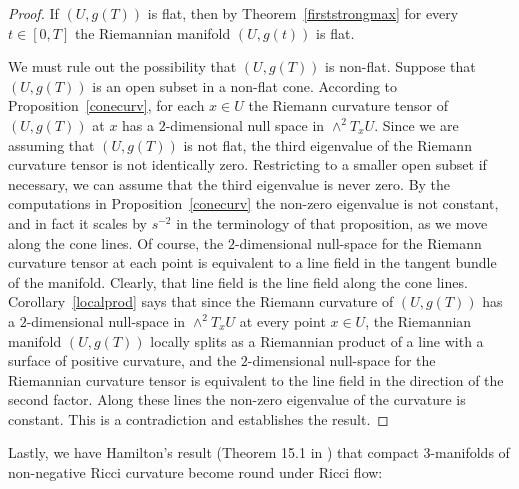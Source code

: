 \begin{proof}
If $(U,g(T))$ is flat, then by Theorem~\ref{firststrongmax}
 for every $t\in [0,T]$ the
Riemannian manifold $(U,g(t))$ is flat.

We must rule out the possibility that $(U,g(T))$ is  non-flat. Suppose that
$(U,g(T))$ is an open subset in a non-flat cone. According to
Proposition~\ref{conecurv},  for each $x\in U$ the Riemann curvature tensor of
$(U,g(T))$ at $x$ has a $2$-dimensional null space in $\wedge^2T_xU$. Since we
are assuming that $(U,g(T))$ is not flat, the third eigenvalue of the Riemann
curvature tensor is not identically zero. Restricting to a smaller open subset
if necessary, we can assume that the third eigenvalue is never zero. By the
computations in Proposition~\ref{conecurv} the non-zero eigenvalue is not
constant, and in fact it scales by $s^{-2}$ in the terminology of that
proposition, as we move along the cone lines. Of course, the $2$-dimensional
null-space for the Riemann curvature tensor at each point is equivalent to a
line field in the tangent bundle of the manifold. Clearly, that line field is
the line field along the cone lines. Corollary~\ref{localprod} says that since
the Riemann curvature of $(U,g(T))$ has a $2$-dimensional null-space in
$\wedge^2T_xU$ at every point $x\in U$, the Riemannian manifold $(U,g(T))$
locally splits as a Riemannian product of a line with a surface of positive
curvature, and the $2$-dimensional null-space for the Riemannian curvature
tensor is equivalent to the line field in the direction of the second factor.
Along these lines the non-zero eigenvalue of the curvature is constant. This is
a contradiction and establishes the result.
\end{proof}

Lastly, we have Hamilton's result (Theorem 15.1 in
\cite{Hamilton3MPRC}) that compact $3$-manifolds of non-negative
Ricci curvature become round under Ricci flow:

